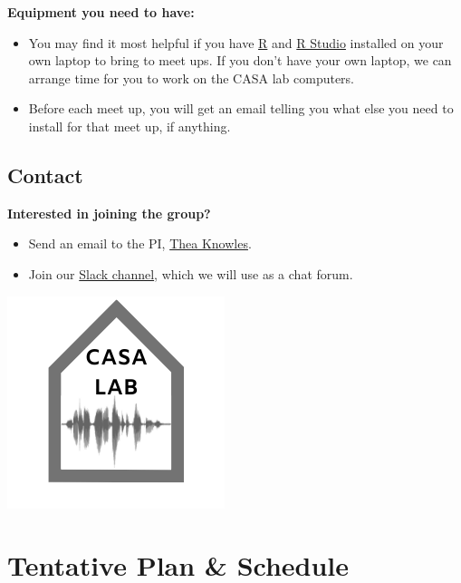 \documentclass[
]{book}
\providecommand{\tightlist}{%
  \setlength{\itemsep}{0pt}\setlength{\parskip}{0pt}}
\begin{document}
\textbf{Equipment you need to have:}

\begin{itemize}
\tightlist
\item
  You may find it most helpful if you have \href{https://www.r-project.org/}{R} and \href{https://rstudio.com/}{R Studio} installed on your own laptop to bring to meet ups. If you don't have your own laptop, we can arrange time for you to work on the CASA lab computers.
\item
  Before each meet up, you will get an email telling you what else you need to install for that meet up, if anything.
\end{itemize}

\hypertarget{contact}{%
\section*{Contact}\label{contact}}

\textbf{Interested in joining the group?}

\begin{itemize}
\tightlist
\item
  Send an email to the PI, \href{mailto:theaknow@buffalo.edu}{Thea Knowles}.
\item
  Join our \href{https://join.slack.com/t/casa-lab-ub/shared_invite/enQtOTEyMDk1MzkxMjgzLWU3ZGVhYWViOWU1YjJkZjA0OGEzZGNkMTdhNjM4ZWM5N2FlMDEwOWI3MzE3MWQ4YzM1MmMzYmFiYWIxZGI2NTg}{Slack channel}, which we will use as a chat forum.
\end{itemize}

\href{https://casa-lab.netlify.com}{\includegraphics{img/casa-lab-logo.png}}

\hypertarget{intro}{%
\chapter{Tentative Plan \& Schedule}\label{intro}}
\end{document}
